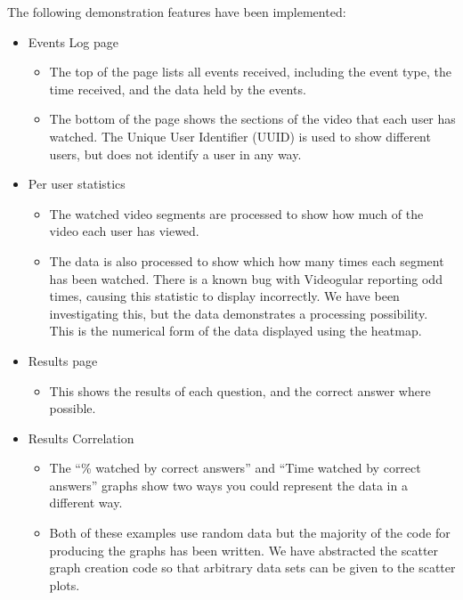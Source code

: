 \documentclass[12pt,a4paper]{article}
\begin{document}
The following demonstration features have been implemented:

\begin{itemize}
\item Events Log page
	\begin{itemize}
	\item The top of the page lists all events received, including the event type, the time received, and the data held by the events.
	\item The bottom of the page shows the sections of the video that each user has watched. The Unique User Identifier (UUID) is used to show different users, but does not identify a user in any way.
	\end{itemize}

\item Per user statistics
	\begin{itemize}
	\item The watched video segments are processed to show how much of the video each user has viewed.
	\item The data is also processed to show which how many times each segment has been watched. There is a known bug with Videogular reporting odd times, causing this statistic to display incorrectly. We have been investigating this, but the data demonstrates a processing possibility. This is the numerical form of the data displayed using the heatmap.
	\end{itemize}

\item Results page
	\begin{itemize}
	\item This shows the results of each question, and the correct answer where possible.
	\end{itemize}

\item Results Correlation
	\begin{itemize}
	\item The ``\% watched by correct answers'' and ``Time watched by correct answers'' graphs show two ways you could represent the data in a different way.
	\item Both of these examples use random data but the majority of the code for producing the graphs has been written. We have abstracted the scatter graph creation code so that arbitrary data sets can be given to the scatter plots.
	\end{itemize}

\end{itemize}
\end{document}
